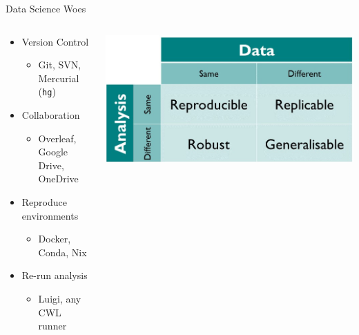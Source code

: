 \documentclass[bigger,unknownkeysallowed,aspectratio=169,red,colorblocks]{beamer}
\begin{document}
\begin{frame}[label={sec:orgf9a1996},fragile]{Data Science Woes}
 \begin{columns}
\begin{column}{0.4\columnwidth}
\begin{itemize}
\item Version Control
\begin{itemize}
\item Git, SVN, Mercurial (\texttt{hg})
\end{itemize}
\item Collaboration
\begin{itemize}
\item Overleaf, Google Drive, OneDrive
\end{itemize}
\item Reproduce environments
\begin{itemize}
\item Docker, Conda, \alert{Nix}
\end{itemize}
\item Re-run analysis
\begin{itemize}
\item Luigi, any CWL runner
\end{itemize}
\end{itemize}
\end{column}

\begin{column}{0.6\columnwidth}
\begin{center}
\includegraphics[width=.9\linewidth]{images/ReproducibleMatrix.jpg}
\end{center}
\end{column}
\end{columns}
\end{frame}
\end{document}
